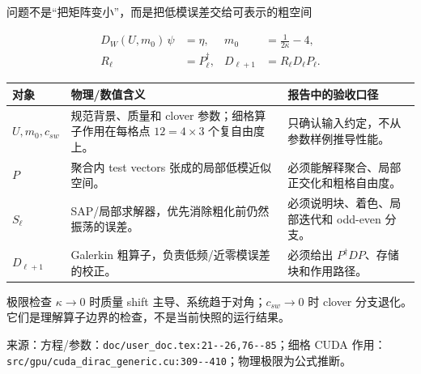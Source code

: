 \documentclass[UTF8,aspectratio=169,11pt]{ctexbeamer}
\newcommand{\source}[1]{%
  \vspace{0.06em}\par{\raggedright\scriptsize\color{muted}来源：#1\par}}
\newcommand{\code}[1]{\nolinkurl{#1}}
\newcommand{\denseframe}{%
  \footnotesize
  \setlength{\tabcolsep}{2.5pt}%
  \renewcommand{\arraystretch}{0.76}%
}
\begin{document}
\begin{frame}[t]{问题不是“把矩阵变小”，而是把低模误差交给可表示的粗空间}
  \denseframe
  \scriptsize
  \begin{align*}
    D_W(U,m_0)\,\psi &= \eta,
    &m_0&=\frac{1}{2\kappa}-4,\\[-1mm]
    R_\ell&=P_\ell^\dagger,
    &D_{\ell+1}&=R_\ell D_\ell P_\ell .
  \end{align*}
  \begin{tabularx}{0.96\textwidth}{@{}p{}YY@{}}
    \toprule
    对象 & 物理/数值含义 & 报告中的验收口径 \\
    \midrule
    $U,m_0,c_{sw}$ & 规范背景、质量和 clover 参数；细格算子作用在每格点 $12=4\times3$ 个复自由度上。 & 只确认输入约定，不从参数样例推导性能。 \\
    $P$ & 聚合内 test vectors 张成的局部低模近似空间。 & 必须能解释聚合、局部正交化和粗格自由度。 \\
    $S_\ell$ & SAP/局部求解器，优先消除粗化前仍然振荡的误差。 & 必须说明块、着色、局部迭代和 odd-even 分支。 \\
    $D_{\ell+1}$ & Galerkin 粗算子，负责低频/近零模误差的校正。 & 必须给出 $P^\dagger D P$、存储块和作用路径。 \\
    \bottomrule
  \end{tabularx}
  \vspace{0cm}
  \begin{block}{极限检查}
    $\kappa\to0$ 时质量 shift 主导、系统趋于对角；$c_{sw}\to0$ 时 clover 分支退化。它们是理解算子边界的检查，不是当前快照的运行结果。
  \end{block}
  \source{方程/参数：\code{doc/user_doc.tex:21--26,76--85}；细格 CUDA 作用：\code{src/gpu/cuda_dirac_generic.cu:309--410}；物理极限为公式推断。}
\end{frame}
\end{document}
